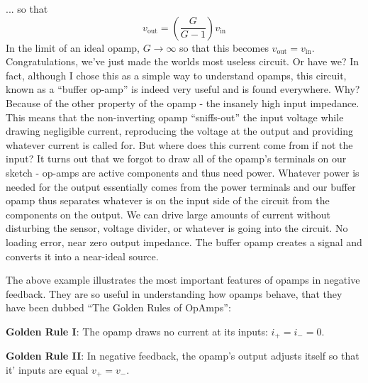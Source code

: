 \documentclass{tufte-book}
\begin{document}
\noindent ... so that 
\begin{equation}
\label{eq:opamp_analysis_feedback}
v_\text{out} = \left(\frac{G}{G-1}\right)v_\text{in}
\end{equation}
In the limit of an ideal opamp, $G\rightarrow\infty$ so that this becomes $v_\text{out} = v_\text{in}$. Congratulations, we've just made the worlds most useless circuit. Or have we? In fact, although I chose this as a simple way to understand opamps, this circuit, known as a ``buffer op-amp'' is indeed very useful and is found everywhere. Why? Because of the other property of the opamp - the insanely high input impedance. This means that the non-inverting opamp ``sniffs-out'' the input voltage while drawing negligible current, reproducing the voltage at the output and providing whatever current is called for. But where does this current come from if not the input? It turns out that we forgot to draw all of the opamp's terminals on our sketch - op-amps are active components and thus need power. Whatever power is needed for the output essentially comes from the power terminals and our buffer opamp thus separates whatever is on the input side of the circuit from the components on the output. We can drive large amounts of current without disturbing the sensor, voltage divider, or whatever is going into the circuit. No loading error, near zero output impedance. The buffer opamp creates a signal and converts it into a near-ideal source.

The above example illustrates the most important features of opamps in negative feedback. They are so useful in understanding how opamps behave, that they have been dubbed ``The Golden Rules of OpAmps'':

\textbf{Golden Rule I}: The opamp draws no current at its inputs: $i_+ = i_- = 0$.

\textbf{Golden Rule II}: In negative feedback, the opamp's output adjusts itself so that it' inputs are equal $v_+ = v_-$.
\end{document}

